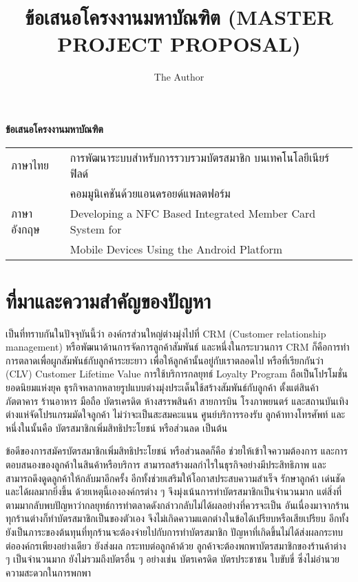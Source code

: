 \documentclass[a4paper]{article}
\title{ข้อเสนอโครงงานมหาบัณฑิต (MASTER PROJECT PROPOSAL)}
\author{The Author}
\newcommand{\MarginText}[1]{\marginpar{\raggedleft\itshape\small#1}} %
\newcommand{\Description}[1]{\hangindent=2em\hangafter=0\noindent\raggedright\footnotesize{#1}\par\normalsize\vspace{1em}}
\begin{document}

\begin{center}
{\huge \bf ข้อเสนอโครงงานมหาบัณฑิต}
\end{center}


\Large{\noindent\hspace{0.7cm}\setlength{\tabcolsep}{15pt}
\begin{tabular}{l l}    
	ภาษาไทย 	& การพัฒนาระบบสำหรับการรวบรวมบัตรสมาชิก บนเทคโนโลยีเนียร์ฟิลด์ \\
				& คอมมูนิเคชันด้วยแอนดรอยด์แพลตฟอร์ม \\
	ภาษาอังกฤษ	& Developing a NFC Based Integrated Member Card System for \\
				& Mobile Devices Using the Android Platform \\    
\end{tabular}
}

\section{ที่มาและความสำคัญของปัญหา}

เป็นที่ทราบกันในปัจจุบันนี้ว่า องค์กรส่วนใหญ่ต่างมุ่งไปที่ CRM (Customer relationship management) หรือพัฒนาด้านการจัดการลูกค้าสัมพันธ์ และหนึ่งในกระบวนการ CRM ก็คือการทําการตลาดเพื่อผูกสัมพันธ์กับลูกค้าระยะยาว เพื่อให้ลูกค้านั้นอยู่กับเราตลอดไป หรือที่เรียกกันว่า (CLV) Customer Lifetime Value การใช้บริการกลยุทธ์ Loyalty Program ถือเป็นโปรโมชั่นยอดนิยมแห่งยุค ธุรกิจหลากหลายรูปแบบต่างมุ่งประเด็นใช้สร้างสัมพันธ์กับลูกค้า ตั้งแต่สินค้า ภัตตาคาร ร้านอาหาร มือถือ บัตรเครดิต ห้างสรรพสินค้า สายการบิน โรงภาพยนตร์ และสถานบันเทิง ต่างแห่จัดโปรแกรมมัดใจลูกค้า ไม่ว่าจะเป็นสะสมคะแนน ศูนย์บริการรองรับ ลูกค้าทางโทรศัพท์ และหนึ่งในนั้นคือ บัตรสมาชิกเพิ่มสิทธิประโยชน์ หรือส่วนลด เป็นต้น 

ข้อดีของการสมัครบัตรสมาชิกเพิ่มสิทธิประโยชน์ หรือส่วนลดก็คือ ช่วยให้เข้าใจความต้องการ และการตอบสนองของลูกค้าในสินค้าหรือบริการ สามารถสร้างผลกําไรในธุรกิจอย่างมีประสิทธิภาพ และสามารถดึงดูดลูกค้าให้กลับมาอีกครั้ง อีกทั้งช่วยเสริมให้โอกาสประสบความสําเร็จ รักษาลูกค้า เด่นชัด และได้ผลมากยิ่งขึ้น ด้วยเหตุนี้เององค์กรต่าง ๆ จึงมุ่งเน้นการทำบัตรสมาชิกเป็นจำนวนมาก แต่สิ่งที่ตามมากลับพบปัญหาว่ากลยุทธ์การทำตลาดดังกล่าวกลับไม่ได้ผลอย่างที่ควรจะเป็น อันเนื่องมาจากร้านทุกร้านต่างก็ทำบัตรสมาชิกเป็นของตัวเอง จึงไม่เกิดความแตกต่างในข้อได้เปรียบหรือเสียเปรียบ อีกทั้งยังเป็นภาระของต้นทุนที่ทุกร้านจะต้องจ่ายไปกับการทำบัตรสมาชิก ปัญหาที่เกิดขึ้นไม่ได้ส่งผลกระทบต่อองค์กรเพียงอย่างเดียว  ยังส่งผล \newline กระทบต่อลูกค้าด้วย ลูกค้าจะต้องพกพาบัตรสมาชิกของร้านค้าต่าง ๆ เป็นจำนวนมาก ยังไม่รวมถึงบัตรอื่น ๆ อย่างเช่น บัตรเครดิต บัตรประชาชน ใบขับขี่ ซึ่งไม่อำนวยความสะดวกในการพกพา
\end{document}
